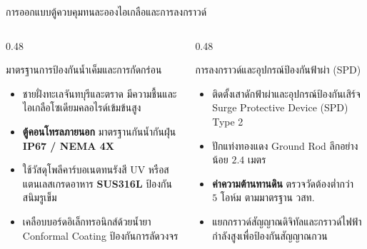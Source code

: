 \documentclass[aspectratio=169, 10pt]{beamer}
\begin{document}
\begin{frame}{การออกแบบตู้ควบคุมทนละอองไอเกลือและการลงกราวด์}
\begin{columns}[T]
    \begin{column}{0.48\textwidth}
        \begin{mastercard}{มาตรฐานการป้องกันน้ำเค็มและการกัดกร่อน}
            \begin{itemize}
                \item ชายฝั่งทะเลจันทบุรีและตราด มีความชื้นและไอเกลือโซเดียมคลอไรด์เข้มข้นสูง
                \item \textbf{ตู้คอนโทรลภายนอก} มาตรฐานกันน้ำกันฝุ่น \textbf{IP67 / NEMA 4X}
                \item ใช้วัสดุโพลีคาร์บอเนตทนรังสี UV หรือสแตนเลสเกรดอาหาร \textbf{SUS316L} ป้องกันสนิมรูเข็ม
                \item เคลือบบอร์ดอิเล็กทรอนิกส์ด้วยน้ำยา Conformal Coating ป้องกันการลัดวงจร
            \end{itemize}
        \end{mastercard}
    \end{column}
    \begin{column}{0.48\textwidth}
        \begin{goldcard}{การลงกราวด์และอุปกรณ์ป้องกันฟ้าผ่า (SPD)}
            \begin{itemize}
                \item ติดตั้งเสาดักฟ้าผ่าและอุปกรณ์ป้องกันเสิร์จ Surge Protective Device (SPD) Type 2
                \item ปักแท่งทองแดง Ground Rod ลึกอย่างน้อย $2.4\text{ เมตร}$
                \item \textbf{ค่าความต้านทานดิน} ตรวจวัดต้องต่ำกว่า $5\text{ โอห์ม}$ ตามมาตรฐาน วสท.
                \item แยกกราวด์สัญญาณดิจิทัลและกราวด์ไฟฟ้ากำลังสูงเพื่อป้องกันสัญญาณกวน
            \end{itemize}
        \end{goldcard}
    \end{column}
\end{columns}
\end{frame}
\end{document}
